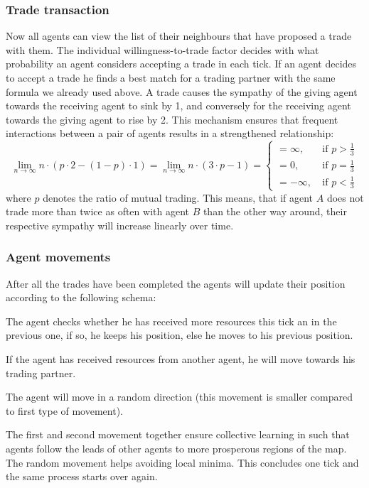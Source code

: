 \documentclass{JASSS}
\begin{document}
	
\subsubsection{Trade transaction}
	 Now all agents can view the list of their neighbours that have proposed a trade with them. The individual willingness-to-trade factor decides with what probability an agent considers accepting a trade in each tick. If an agent decides to accept a trade he finds a best match for a trading partner with the same formula we already used above. A trade causes the sympathy of the giving agent towards the receiving agent to sink by 1, and conversely for the receiving agent towards the giving agent to rise by 2. This mechanism ensures that frequent interactions between a pair of agents results in a strengthened relationship:
	 \begin{equation}
	 	\lim_{n \to \infty} n \cdot (p\cdot 2 - (1 - p)\cdot 1) = \lim_{n \to \infty} n \cdot (3\cdot p - 1) = \begin{cases}
	 	= \infty,\quad &\text{if $p > \frac{1}{3}$}\\
	 		= 0, &\text{if $p = \frac{1}{3}$}\\
	 		= -\infty, &\text{if $p < \frac{1}{3}$}
	 	\end{cases}
	 \end{equation}
	 where $p$ denotes the ratio of mutual trading. This means, that if agent $A$ does not trade more than twice as often with agent $B$ than the other way around, their respective sympathy will increase linearly over time.

\subsubsection{Agent movements}
		After all the trades have been completed the agents will update their position according to the following schema:
\begin{enumerate*}
	\item
		The agent checks whether he has received more resources this tick an in the previous one, if so, he keeps his position, else he moves to his previous position.

	\item
		If the agent has received resources from another agent, he will move towards his trading partner.

	\item
		The agent will move in a random direction (this movement is smaller compared to first type of movement). 
\end{enumerate*}
The first and second movement together ensure collective learning in such that agents follow the leads of other agents to more prosperous regions of the map. The random movement helps avoiding local minima. This concludes one tick and the same process starts over again.
\end{document}
